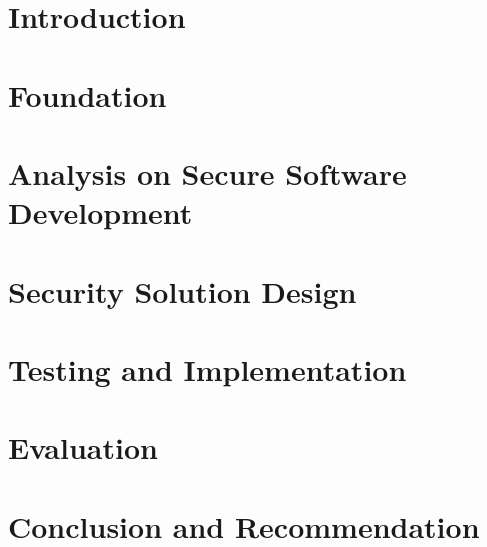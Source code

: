 \documentclass[12pt]{report}
\begin{document}
% 

% 

% 

% 


\chapter{Introduction}





\chapter{\centeringTheoretical Foundation}\label{chap:2}






\chapter{Analysis on Secure Software Development}\label{chap:3}


\chapter{Security Solution Design}


\chapter{Testing and Implementation}


\chapter{Evaluation}



\chapter{Conclusion and Recommendation}


\printbibliography
\end{document}
